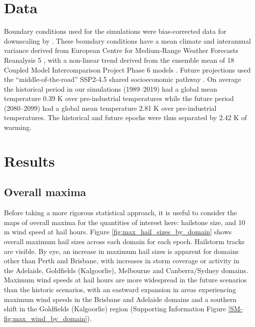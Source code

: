 \documentclass[]{agujournal2019}\usepackage[]{graphicx}\usepackage[]{xcolor}
\begin{document}
\section{Data}

Boundary conditions used for the simulations were bias-corrected data for downscaling by . These boundary conditions have a mean climate and interannual variance derived from European Centre for Medium-Range Weather Forecasts Reanalysis 5 \cite<ERA5,>{Hersbach_QJRMS_2020}, with a non-linear trend derived from the ensemble mean of 18 Coupled Model Intercomparison Project Phase 6 \cite<CMIP6,>{Eyring_GMD_2016} models \cite{Xu_SD_2021}. Future projections used the ``middle-of-the-road'' SSP2-4.5 shared socioeconomic pathway \cite<SSP,>{ONeill_GEC_2017}. On average the historical period in our simulations (1989--2019) had a global mean temperature 0.39 K over pre-industrial temperatures \cite<1850--1990, using the CMIP6 35-model ensemble,>{Gutierrez_2021} while the future period (2080--2099) had a global mean temperature 2.81 K over pre-industrial temperatures. The historical and future epochs were thus separated by 2.42 K of warming.

\section{Results}
\label{sec:results}

\subsection{Overall maxima}
\label{sec:overall_maxima}

Before taking a more rigorous statistical approach, it is useful to consider the maps of overall maxima for the quantities of interest here: hailstone size, and 10 m wind speed at hail hours. Figure \ref{fig:max_hail_sizes_by_domain} shows overall maximum hail sizes across each domain for each epoch. Hailstorm tracks are visible. By eye, an increase in maximum hail sizes is apparent for domains other than Perth and Brisbane, with increases in storm coverage or activity in the Adelaide, Goldfields (Kalgoorlie), Melbourne and Canberra/Sydney domains. Maximum wind speeds at hail hours are more widespread in the future scenarios than the historic scenarios, with an eastward expansion in areas experiencing maximum wind speeds in the Brisbane and Adelaide domains and a southern shift in the Goldfields (Kalgoorlie) region (Supporting Information Figure \ref{SM-fig:max_wind_by_domain}).
\end{document}
